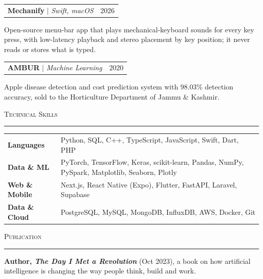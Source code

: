 \documentclass[10pt,letterpaper]{article}
\makeatletter
\renewcommand{\section}[1]{%
  \vspace{6pt}%
  {\large\scshape #1}\par
  \vspace{-8pt}\rule{\textwidth}{0.4pt}\par
  \vspace{-1pt}%
}
\newcommand{\project}[3]{%
  \vspace{2pt}%
  \begin{tabular*}{\textwidth}{l@{\extracolsep{\fill}}r}
    \small\textbf{#1} $|$ \textit{#2} & \small #3 \\
  \end{tabular*}\par\vspace{-2pt}%
}
\newenvironment{bullets}{%
  \begin{list}{\textbullet}{%
    \setlength{\leftmargin}{0.16in}\setlength{\labelwidth}{0.1in}\setlength{\labelsep}{0.06in}%
    \setlength{\itemsep}{0pt}\setlength{\parsep}{0pt}\setlength{\topsep}{1pt}\setlength{\partopsep}{0pt}}%
  \small
}{%
  \end{list}%
}
\makeatother
\begin{document}
\project{Mechanify}{Swift, macOS}{2026}
\begin{bullets}
  \item Open-source menu-bar app that plays mechanical-keyboard sounds for every key press, with low-latency playback and stereo placement by key position; it never reads or stores what is typed.
\end{bullets}

\project{AMBUR}{Machine Learning}{2020}
\begin{bullets}
  \item Apple disease detection and cost prediction system with 98.03\% detection accuracy, sold to the Horticulture Department of Jammu \& Kashmir.
\end{bullets}

\section{Technical Skills}
{\small
\begin{tabular*}{\textwidth}{@{}p{1.15in}@{}p{\dimexpr\textwidth-1.15in\relax}@{}}
  \textbf{Languages}      & Python, SQL, C++, TypeScript, JavaScript, Swift, Dart, PHP \\
  \textbf{Data \& ML}     & PyTorch, TensorFlow, Keras, scikit-learn, Pandas, NumPy, PySpark, Matplotlib, Seaborn, Plotly \\
  \textbf{Web \& Mobile}  & Next.js, React Native (Expo), Flutter, FastAPI, Laravel, Supabase \\
  \textbf{Data \& Cloud}  & PostgreSQL, MySQL, MongoDB, InfluxDB, AWS, Docker, Git \\
\end{tabular*}\par}

\section{Publication}
\begin{bullets}
  \item \textbf{Author, \textit{The Day I Met a Revolution}} (Oct 2023), a book on how artificial intelligence is changing the way people think, build and work.
\end{bullets}
\end{document}
